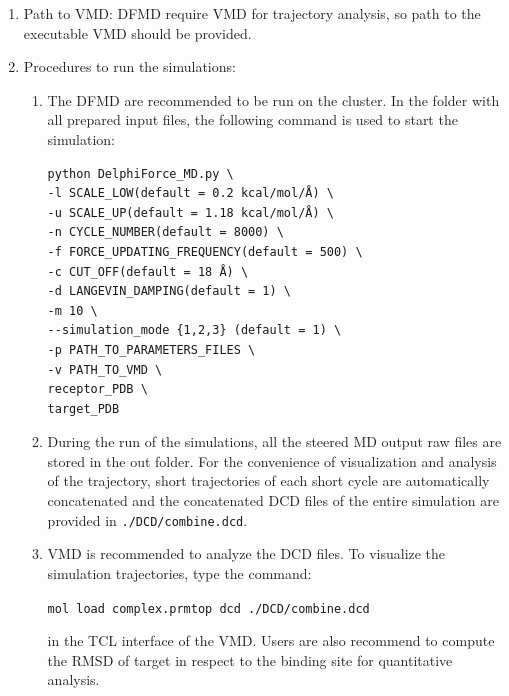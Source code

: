\documentclass[9pt,tutorial,pubversion]{livecoms}
\begin{document}
\begin{enumerate}
\item Path to VMD: DFMD require VMD for trajectory analysis, so path to the executable VMD should be provided.
\item 
Procedures to run the simulations:
\begin{enumerate}
\item The DFMD are recommended to be run on the cluster.  In the folder with all prepared input files, the following command is used to start the simulation:

\begin{verbatim}
python DelphiForce_MD.py \
-l SCALE_LOW(default = 0.2 kcal/mol/Å) \
-u SCALE_UP(default = 1.18 kcal/mol/Å) \
-n CYCLE_NUMBER(default = 8000) \
-f FORCE_UPDATING_FREQUENCY(default = 500) \
-c CUT_OFF(default = 18 Å) \
-d LANGEVIN_DAMPING(default = 1) \
-m 10 \
--simulation_mode {1,2,3} (default = 1) \
-p PATH_TO_PARAMETERS_FILES \
-v PATH_TO_VMD \
receptor_PDB \
target_PDB
\end{verbatim}

\item During the run of the simulations, all the steered MD output raw files are stored in the out folder. For the convenience of visualization and analysis of the trajectory, short trajectories of each short cycle are automatically concatenated and the concatenated DCD files of the entire simulation are provided in \texttt{./DCD/combine.dcd}.
\item VMD is recommended to analyze the DCD files. To visualize the simulation trajectories, type the command:

\texttt{mol load complex.prmtop dcd ./DCD/combine.dcd}

in the TCL interface of the VMD. Users are also recommend to compute the RMSD of target in respect to the binding site for quantitative analysis.
\end{enumerate}
\end{enumerate}
\end{document}
